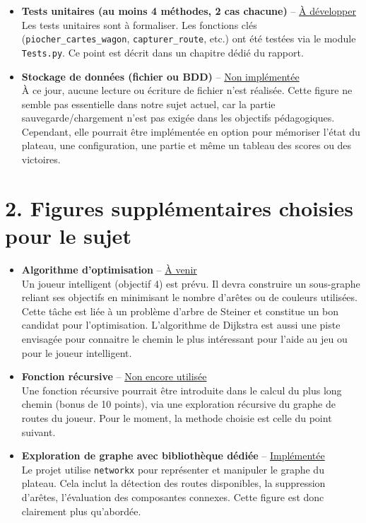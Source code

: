 \documentclass[a4paper,12pt]{report}
\begin{document}
\begin{itemize}
    \item \textbf{Tests unitaires (au moins 4 méthodes, 2 cas chacune)} – \underline{À développer} \\
    Les tests unitaires sont à formaliser.
    Les fonctions clés (\texttt{piocher\_cartes\_wagon}, \texttt{capturer\_route}, etc.) ont été testées via le module
    \texttt{Tests.py}. Ce point est décrit dans un chapitre dédié du rapport.

    \item \textbf{Stockage de données (fichier ou BDD)} – \underline{Non implémentée} \\
    À ce jour, aucune lecture ou écriture de fichier n’est réalisée.
    Cette figure ne semble pas essentielle dans notre sujet actuel, car la partie sauvegarde/chargement n’est pas exigée
    dans les objectifs pédagogiques. Cependant, elle pourrait être implémentée en option pour mémoriser l’état du
    plateau, une configuration, une partie et même un tableau des scores ou des victoires.

\end{itemize}

\section*{2. Figures supplémentaires choisies pour le sujet}

\begin{itemize}
    \item \textbf{Algorithme d’optimisation} – \underline{À venir} \\
    Un joueur intelligent (objectif 4) est prévu.
    Il devra construire un sous-graphe reliant ses objectifs en minimisant le nombre d’arêtes ou de couleurs utilisées.
    Cette tâche est liée à un problème d’arbre de Steiner et constitue un bon candidat pour l’optimisation.
    L'algorithme de Dijkstra est aussi une piste envisagée pour connaitre le chemin le plus intéressant pour l'aide au
    jeu ou pour le joueur intelligent.

    \item \textbf{Fonction récursive} – \underline{Non encore utilisée} \\
    Une fonction récursive pourrait être introduite dans le calcul du plus long chemin (bonus de 10 points),
    via une exploration récursive du graphe de routes du joueur.
    Pour le moment, la methode choisie est celle du point suivant.

    \item \textbf{Exploration de graphe avec bibliothèque dédiée} – \underline{Implémentée} \\
    Le projet utilise \texttt{networkx} pour représenter et manipuler le graphe du plateau.
    Cela inclut la détection des routes disponibles, la suppression d’arêtes, l’évaluation des composantes connexes.
    Cette figure est donc clairement plus qu'abordée.

\end{itemize}
\end{document}
